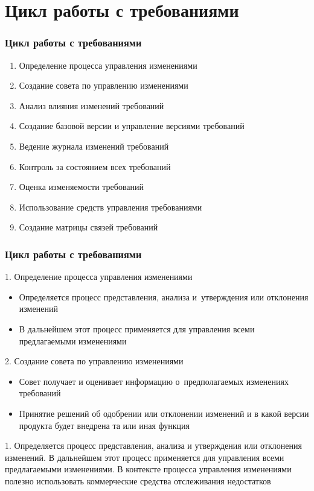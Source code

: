 \documentclass{../industrial-development}
\begin{document}
\section{Цикл работы с требованиями}
\begin{frame} \frametitle{Цикл работы с требованиями}
	\begin{enumerate}
\item Определение процесса управления изменениями
\item Создание совета по управлению изменениями
\item Анализ влияния изменений требований
\item Создание базовой версии и управление версиями требований
\item Ведение журнала изменений требований
\item Контроль за состоянием всех требований
\item Оценка изменяемости требований
\item Использование средств управления требованиями
\item Создание матрицы связей требований
	\end{enumerate}
\end{frame}



\begin{frame} \frametitle{Цикл работы с требованиями}
	1. Определение процесса управления изменениями
	\begin{itemize}
\item Определяется процесс представления, анализа и~утверждения или отклонения изменений
\item В дальнейшем этот процесс применяется для управления всеми предлагаемыми изменениями
	\end{itemize}
	2. Создание совета по управлению изменениями
	\begin{itemize}
\item Совет получает и оценивает информацию о~предполагаемых изменениях требований
\item Принятие решений об одобрении или отклонении изменений и в какой версии продукта будет внедрена та или иная функция 
	\end{itemize}
\end{frame}

\lecturenotes

1. Определяется процесс представления, анализа и утверждения или отклонения изменений. В дальнейшем этот процесс применяется для управления всеми предлагаемыми изменениями. В контексте процесса управления изменениями полезно использовать коммерческие средства отслеживания недостатков
\end{document}
